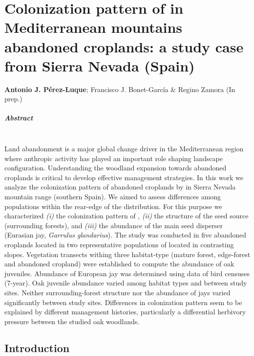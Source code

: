 %
\chapter{\textcolor{ctcolormain}{Colonization pattern of \Qp in Mediterranean mountains abandoned croplands: a study case from Sierra Nevada (Spain)}}\label{sec:coloniza}


\mbox{}
\vfill
{\color{ctcolormain}\textbf{Antonio J. Pérez-Luque}}; Francisco J. Bonet-García \& Regino Zamora (In prep.)


\newpage

\paragraph{Abstract} \mbox{} \\
Land abandonment is a major global change driver in the Mediterranean region where anthropic activity has played an important role shaping landscape configuration. Understanding the woodland expansion towards abandoned croplands is critical to develop effective management strategies. In this work we analyze the colonization pattern of abandoned croplands by \Qpy in Sierra Nevada mountain range (southern Spain). We aimed to assess differences among populations within the rear-edge of the \Qp distribution. For this purpose we characterized \emph{(i)} the colonization pattern of \Qp, \emph{(ii)} the structure of the seed source (surrounding forests), and \emph{(iii)} the abundance of the main seed disperser (Eurasian jay, \emph{Garrulus glandarius}). The study was conducted in five abandoned croplands located in two representative populations of \Qp located in contrasting slopes. Vegetation transects withing three habitat-type (mature forest, edge-forest and abandoned cropland) were established to compute the abundance of oak juveniles. Abundance of European jay was determined using data of bird censuses (7-year). Oak juvenile abundance varied among habitat types and between study sites. Neither surrounding-forest structure nor the abundance of jays varied significantly between study sites. Differences in colonization pattern seem to be explained by different management histories, particularly a differential herbivory pressure between the studied oak woodlands. 
\newpage

\section{Introduction}\label{sec:coloniza:intro}

